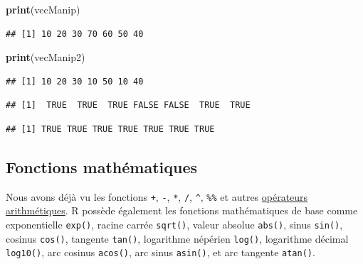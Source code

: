 \documentclass[
]{book}
\newenvironment{Shaded}{\begin{snugshade}}{\end{snugshade}}
\newcommand{\KeywordTok}[1]{\textcolor[rgb]{0.13,0.29,0.53}{\textbf{#1}}}
\newcommand{\NormalTok}[1]{#1}
\newcommand{\OperatorTok}[1]{\textcolor[rgb]{0.81,0.36,0.00}{\textbf{#1}}}
\newcommand{\StringTok}[1]{\textcolor[rgb]{0.31,0.60,0.02}{#1}}
\begin{document}
\begin{Shaded}
\begin{Highlighting}[]
\KeywordTok{print}\NormalTok{(vecManip)}
\end{Highlighting}
\end{Shaded}

\begin{verbatim}
## [1] 10 20 30 70 60 50 40
\end{verbatim}

\begin{Shaded}
\begin{Highlighting}[]
\KeywordTok{print}\NormalTok{(vecManip2)}
\end{Highlighting}
\end{Shaded}

\begin{verbatim}
## [1] 10 20 30 10 50 10 40
\end{verbatim}

\begin{Shaded}
\end{Shaded}

\begin{verbatim}
## [1]  TRUE  TRUE  TRUE FALSE FALSE  TRUE  TRUE
\end{verbatim}

\begin{Shaded}
\end{Shaded}

\begin{verbatim}
## [1] TRUE TRUE TRUE TRUE TRUE TRUE TRUE
\end{verbatim}

\hypertarget{fonctions-mathuxe9matiques}{%
\subsection{Fonctions mathématiques}\label{fonctions-mathuxe9matiques}}

Nous avons déjà vu les fonctions \texttt{+}, \texttt{-}, \texttt{*}, \texttt{/}, \texttt{\^{}}, \texttt{\%\%} et autres \protect\hyperlink{l011opari}{opérateurs arithmétiques}. R possède également les fonctions mathématiques de base comme exponentielle \texttt{exp()}, racine carrée \texttt{sqrt()}, valeur absolue \texttt{abs()}, sinus \texttt{sin()}, cosinus \texttt{cos()}, tangente \texttt{tan()}, logarithme népérien \texttt{log()}, logarithme décimal \texttt{log10()}, arc cosinus \texttt{acos()}, arc sinus \texttt{asin()}, et arc tangente \texttt{atan()}.
\end{document}
